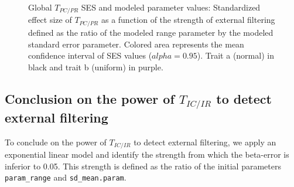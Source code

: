\documentclass[12pt]{article}\usepackage[]{graphicx}\usepackage[]{color}
\newenvironment{knitrout}{}{} %
\begin{document}
\begin{knitrout}
\begin{figure}
{}

\caption[Global $T_{PC/PR}$ SES and modeled parameter values]{Global $T_{PC/PR}$ SES and modeled parameter values: Standardized effect size of $T_{PC/PR}$ as a function of the strength of external filtering defined as the ratio of the modeled range parameter by the modeled standard error parameter. Colored area represents the mean confidence interval of SES values ($alpha = 0.95$). Trait a (normal) in black and trait b (uniform) in purple.}\label{fig:External_filter_Results_plots_modeled_param2}
\end{figure}


\end{knitrout}


  \subsection {Conclusion on the power of $T_{IC/IR}$ to detect external filtering}

To conclude on the power of $T_{IC/IR}$ to detect external filtering, we apply an exponential linear model and identify the strength from which the beta-error is inferior to 0.05. This strength is defined as the ratio of the initial parameters \texttt{param\_range} and \texttt{sd\_mean.param}. 
\end{document}

